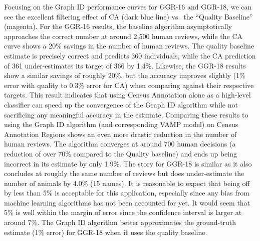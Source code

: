 Focusing on the Graph ID performance curves for GGR-16 and GGR-18, we can see the excellent filtering effect of CA (dark blue line) vs.\ the ``Quality Baseline'' (magenta).  For the GGR-16 results, the baseline algorithm asymptotically approaches the correct number at around 2,500 human reviews, while the CA curve shows a 20\% savings in the number of human reviews.  The quality baseline estimate is precisely correct and predicts 360 individuals, while the CA prediction of 361 under-estimates its target of 366 by 1.4\%.  Likewise, the GGR-18 results show a similar savings of roughly 20\%, but the accuracy improves slightly (1\% error with quality to 0.3\% error for CA) when comparing against their respective targets.  This result indicates that using Census Annotation alone as a high-level classifier can speed up the convergence of the Graph ID algorithm while not sacrificing any meaningful accuracy in the estimate.  Comparing these results to using the Graph ID algorithm (and corresponding VAMP model) on Census Annotation Regions shows an even more drastic reduction in the number of human reviews.  The algorithm converges at around 700 human decisions (a reduction of over 70\% compared to the Quality baseline) and ends up being incorrect in its estimate by only 1.9\%.  The story for GGR-18 is similar as it also concludes at roughly the same number of reviews but does under-estimate the number of animals by 4.0\% (15 names).  It is reasonable to expect that being off by less than 5\% is acceptable for this application, especially since any bias from machine learning algorithms has not been accounted for yet.  It would seem that 5\% is well within the margin of error since the confidence interval is larger at around 7\%.  The Graph ID algorithm better approximates the ground-truth estimate (1\% error) for GGR-18 when it uses the quality baseline.

